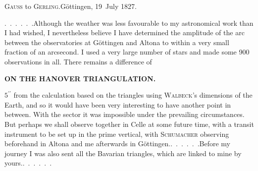 \begin{center}
\textsc{Gauss} to \textsc{Gerling}.\quad Göttingen, 19~July 1827.
\end{center}

\par\noindent\hspace*{\parindent}\mbox{.\ .\ .\ .\ .\ .}\quad Although the weather was less favourable to my astronomical work
than I had wished, I nevertheless believe I have determined the amplitude
of the arc between the observatories at Göttingen
and Altona to within a very small fraction of an arcsecond. I used
a very large number of stars and
made some 900 observations in all. There remains a difference of
\par\clearpage
\noindent\null\hfill{\small\textbf{ON THE HANOVER TRIANGULATION.}}\hfill{}\par\medskip
\noindent \(5^{\prime\prime}\) from the calculation based on the triangles using \textsc{Walbeck}'s dimensions of the Earth,
and so it would have been very interesting to have another point
in between. With the sector it was impossible under the prevailing circumstances.
But perhaps we shall observe together in Celle at some future time, with a transit
instrument to be set up in the prime vertical, with \textsc{Schumacher} observing
beforehand in Altona and me afterwards in \mbox{Göttingen.\quad\mbox{.\ .\ .\ .\ .\ .}}\quad Before my
journey I was also sent all the Bavarian triangles,
which are linked to mine by \mbox{yours.\quad\mbox{.\ .\ .\ .\ .\ .}}
\par
